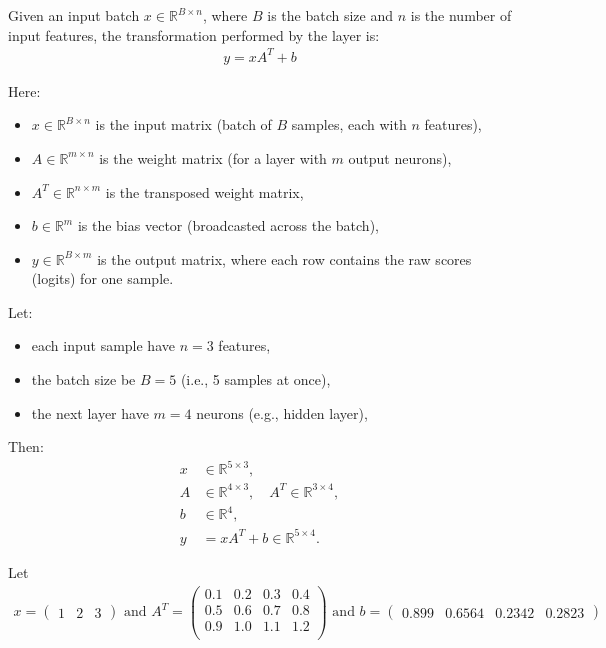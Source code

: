 Given an input batch $x \in \mathbb{R}^{B \times n}$, where $B$ is the batch size and $n$ is the number of input features, the transformation performed by the layer is:
\begin{align}
	y = x A^T + b
\end{align}

Here:
\begin{itemize}
	\item $x \in \mathbb{R}^{B \times n}$ is the input matrix (batch of $B$ samples, each with $n$ features),
	\item $A \in \mathbb{R}^{m \times n}$ is the weight matrix (for a layer with $m$ output neurons),
	\item $A^T \in \mathbb{R}^{n \times m}$ is the transposed weight matrix,
	\item $b \in \mathbb{R}^{m}$ is the bias vector (broadcasted across the batch),
	\item $y \in \mathbb{R}^{B \times m}$ is the output matrix, where each row contains the raw scores (logits) for one sample.
\end{itemize}

Let:
\begin{itemize}
	\item each input sample have $n = 3$ features,
	\item the batch size be $B = 5$ (i.e., 5 samples at once),
	\item the next layer have $m = 4$ neurons (e.g., hidden layer),
\end{itemize}

Then:
\begin{align*}
	x &\in \mathbb{R}^{5 \times 3}, \\
	A &\in \mathbb{R}^{4 \times 3}, \quad A^T \in \mathbb{R}^{3 \times 4}, \\
	b &\in \mathbb{R}^{4}, \\
	y &= x A^T + b \in \mathbb{R}^{5 \times 4}.
\end{align*}

Let
\begin{align} 
	x = \begin{pmatrix}
		1 & 2 & 3 
	\end{pmatrix}
	\text{ and }
	A^T = \begin{pmatrix}
		0.1 & 0.2 & 0.3 & 0.4 \\
		0.5 & 0.6 & 0.7 & 0.8 \\
		0.9 & 1.0 & 1.1 & 1.2 \\
	\end{pmatrix}\text{ and } b= \begin{pmatrix}
		0.899 & 0.6564 & 0.2342 & 0.2823
	\end{pmatrix}
\end{align}

